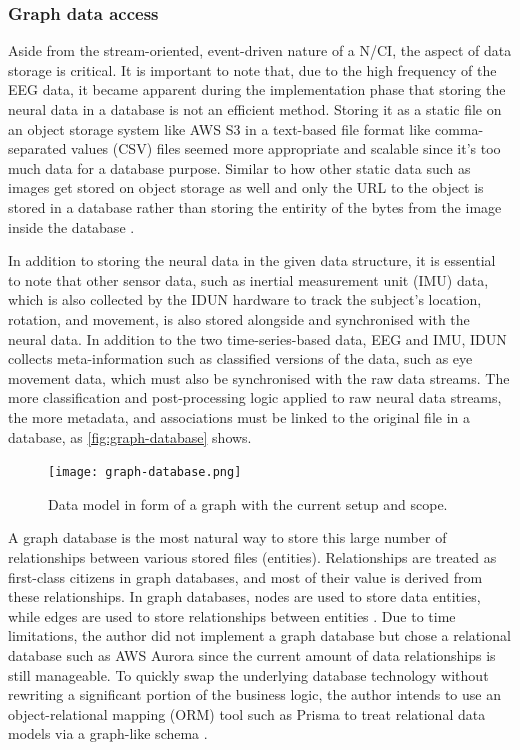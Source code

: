 \subsubsection{Graph data access}
\label{chapter5-graph-data-access}

Aside from the stream-oriented, event-driven nature of a N/CI, the aspect of data storage is critical. It is important to note that, due to the high frequency of the EEG data, it became apparent during the implementation phase that storing the neural data in a database is not an efficient method. Storing it as a static file on an object storage system like AWS S3 in a text-based file format like comma-separated values (CSV) files seemed more appropriate and scalable since it's too much data for a database purpose. Similar to how other static data such as images get stored on object storage as well and only the URL to the object is stored in a database rather than storing the entirity of the bytes from the image inside the database \citep{datanamic_store_nodate}.

In addition to storing the neural data in the given data structure, it is essential to note that other sensor data, such as inertial measurement unit (IMU) data, which is also collected by the IDUN hardware to track the subject's location, rotation, and movement, is also stored alongside and synchronised with the neural data. In addition to the two time-series-based data, EEG and IMU, IDUN collects meta-information such as classified versions of the data, such as eye movement data, which must also be synchronised with the raw data streams. The more classification and post-processing logic applied to raw neural data streams, the more metadata, and associations must be linked to the original file in a database, as \autoref{fig:graph-database} shows.

\begin{figure}[!ht]
  \centering
  \texttt{[image: graph-database.png]}
  \caption{Data model in form of a graph with the current setup and scope.}
  \label{fig:graph-database}
\end{figure}

A graph database is the most natural way to store this large number of relationships between various stored files (entities). Relationships are treated as first-class citizens in graph databases, and most of their value is derived from these relationships. In graph databases, nodes are used to store data entities, while edges are used to store relationships between entities \citep{amazon_web_services_inc_what_nodate}. Due to time limitations, the author did not implement a graph database but chose a relational database such as AWS Aurora since the current amount of data relationships is still manageable. To quickly swap the underlying database technology without rewriting a significant portion of the business logic, the author intends to use an object-relational mapping (ORM) tool such as Prisma to treat relational data models via a graph-like schema \citep{prisma_data_nodate}.

